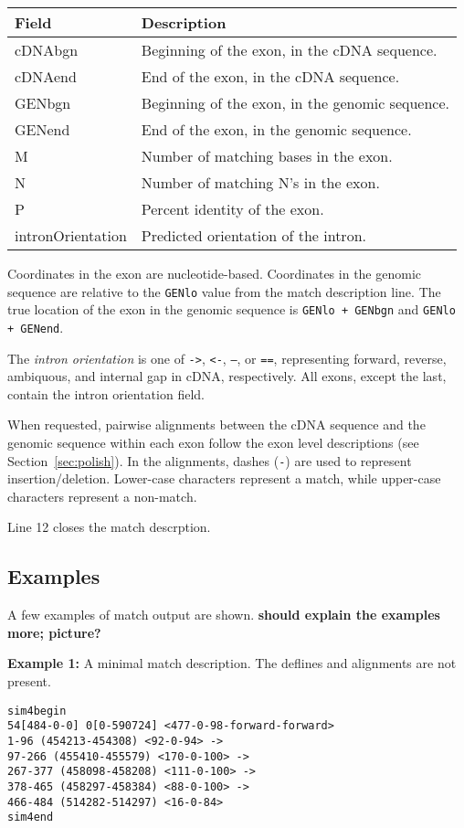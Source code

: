 \documentclass[twoside,11pt]{book}
\begin{document}
\begin{tabular}{|l|l|}
\hline
Field   & Description \\
\hline
\hline
cDNAbgn & Beginning of the exon, in the cDNA sequence. \\
cDNAend & End of the exon, in the cDNA sequence. \\
GENbgn  & Beginning of the exon, in the genomic sequence. \\
GENend  & End of the exon, in the genomic sequence. \\
M       & Number of matching bases in the exon. \\
N       & Number of matching N's in the exon. \\
P       & Percent identity of the exon. \\
intronOrientation & Predicted orientation of the intron. \\
\hline
\end{tabular}

Coordinates in the exon are nucleotide-based.  Coordinates in the
genomic sequence are relative to the {\tt GENlo} value from the match
description line.  The true location of the exon in the genomic sequence is
{\tt GENlo + GENbgn} and {\tt GENlo + GENend}.

The {\it intron orientation} is one of {\tt ->}, {\tt <-}, {\tt --},
or {\tt ==}, representing forward, reverse, ambiquous, and
internal gap in cDNA, respectively.  All exons, except the last,
contain the intron orientation field.

When requested, pairwise alignments between the cDNA sequence and the
genomic sequence within each exon follow the exon level descriptions
(see Section~\ref{sec:polish}).  In the alignments, dashes ({\tt -})
are used to represent insertion/deletion.  Lower-case characters
represent a match, while upper-case characters represent a non-match.

Line 12 closes the match descrption.

\subsection{Examples}

A few examples of match output are shown.  {\bf should explain the
examples more; picture?}

{\bf Example 1:} A minimal match description.  The deflines and
alignments are not present.

\footnotesize
\begin{verbatim}
sim4begin
54[484-0-0] 0[0-590724] <477-0-98-forward-forward>
1-96 (454213-454308) <92-0-94> ->
97-266 (455410-455579) <170-0-100> ->
267-377 (458098-458208) <111-0-100> ->
378-465 (458297-458384) <88-0-100> ->
466-484 (514282-514297) <16-0-84>
sim4end
\end{verbatim}
\normalsize
\end{document}

